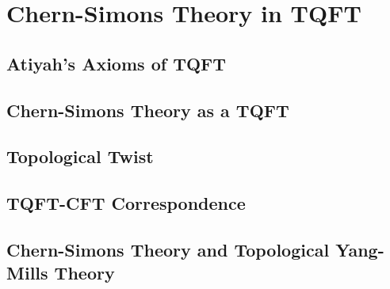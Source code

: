 \section{Chern-Simons Theory in TQFT}\label{sec: C-S Theory in TQFT}
\subsection{Atiyah's Axioms of TQFT} %
\subsection{Chern-Simons Theory as a TQFT} %
\subsection{Topological Twist} %
\subsection{TQFT-CFT Correspondence}
\subsection{Chern-Simons Theory and Topological Yang-Mills Theory}